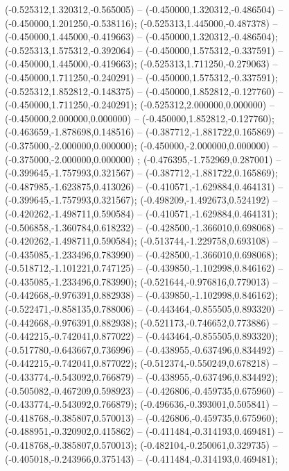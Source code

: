  (-0.525312,1.320312,-0.565005) -- (-0.450000,1.320312,-0.486504) -- (-0.450000,1.201250,-0.538116);
 (-0.525313,1.445000,-0.487378) -- (-0.450000,1.445000,-0.419663) -- (-0.450000,1.320312,-0.486504);
 (-0.525313,1.575312,-0.392064) -- (-0.450000,1.575312,-0.337591) -- (-0.450000,1.445000,-0.419663);
 (-0.525313,1.711250,-0.279063) -- (-0.450000,1.711250,-0.240291) -- (-0.450000,1.575312,-0.337591);
 (-0.525312,1.852812,-0.148375) -- (-0.450000,1.852812,-0.127760) -- (-0.450000,1.711250,-0.240291);
 (-0.525312,2.000000,0.000000) -- (-0.450000,2.000000,0.000000) -- (-0.450000,1.852812,-0.127760);
 (-0.463659,-1.878698,0.148516) -- (-0.387712,-1.881722,0.165869) -- (-0.375000,-2.000000,0.000000);
 (-0.450000,-2.000000,0.000000) -- (-0.375000,-2.000000,0.000000) ;
 (-0.476395,-1.752969,0.287001) -- (-0.399645,-1.757993,0.321567) -- (-0.387712,-1.881722,0.165869);
 (-0.487985,-1.623875,0.413026) -- (-0.410571,-1.629884,0.464131) -- (-0.399645,-1.757993,0.321567);
 (-0.498209,-1.492673,0.524192) -- (-0.420262,-1.498711,0.590584) -- (-0.410571,-1.629884,0.464131);
 (-0.506858,-1.360784,0.618232) -- (-0.428500,-1.366010,0.698068) -- (-0.420262,-1.498711,0.590584);
 (-0.513744,-1.229758,0.693108) -- (-0.435085,-1.233496,0.783990) -- (-0.428500,-1.366010,0.698068);
 (-0.518712,-1.101221,0.747125) -- (-0.439850,-1.102998,0.846162) -- (-0.435085,-1.233496,0.783990);
 (-0.521644,-0.976816,0.779013) -- (-0.442668,-0.976391,0.882938) -- (-0.439850,-1.102998,0.846162);
 (-0.522471,-0.858135,0.788006) -- (-0.443464,-0.855505,0.893320) -- (-0.442668,-0.976391,0.882938);
 (-0.521173,-0.746652,0.773886) -- (-0.442215,-0.742041,0.877022) -- (-0.443464,-0.855505,0.893320);
 (-0.517780,-0.643667,0.736996) -- (-0.438955,-0.637496,0.834492) -- (-0.442215,-0.742041,0.877022);
 (-0.512374,-0.550249,0.678218) -- (-0.433774,-0.543092,0.766879) -- (-0.438955,-0.637496,0.834492);
 (-0.505082,-0.467209,0.598923) -- (-0.426806,-0.459735,0.675960) -- (-0.433774,-0.543092,0.766879);
 (-0.496636,-0.393001,0.505841) -- (-0.418768,-0.385807,0.570013) -- (-0.426806,-0.459735,0.675960);
 (-0.488951,-0.320902,0.415862) -- (-0.411484,-0.314193,0.469481) -- (-0.418768,-0.385807,0.570013);
 (-0.482104,-0.250061,0.329735) -- (-0.405018,-0.243966,0.375143) -- (-0.411484,-0.314193,0.469481);
